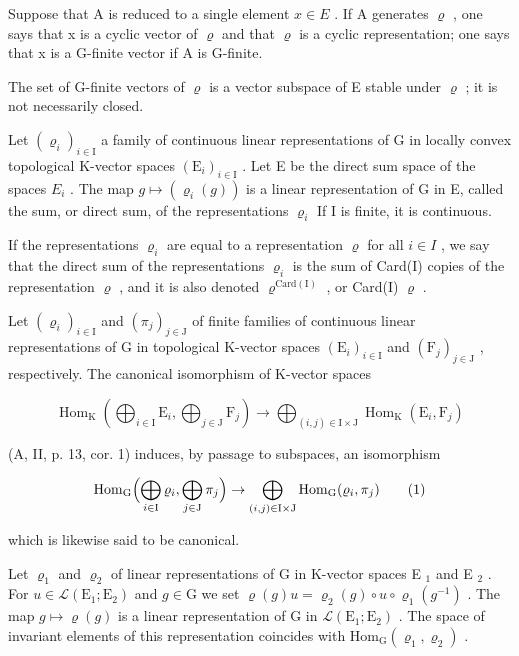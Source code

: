 Suppose that A is reduced to a single element \(x \in E\) . If A generates \(\varrho\) , one says that x is a cyclic vector of \(\varrho\) and that \(\varrho\) is a cyclic representation; one says that x is a G-finite vector if A is G-finite.

The set of G-finite vectors of \(\varrho\) is a vector subspace of E stable under \(\varrho\) ; it is not necessarily closed.

Let \((\varrho_{i})_{i\in\mathrm{I}}\) a family of continuous linear representations of G in locally convex topological K-vector spaces \((\mathrm{E}_{i})_{i\in\mathrm{I}}\) . Let E be the direct sum space of the spaces \(E_{i}\) . The map \(g\mapsto(\varrho_{i}(g))\) is a linear representation of G in E, called the sum, or direct sum, of the representations \(\varrho_{i}\) If I is finite, it is continuous.

If the representations \(\varrho_{i}\) are equal to a representation \(\varrho\) for all \(i \in I\) , we say that the direct sum of the representations \(\varrho_{i}\) is the sum of Card(I) copies of the representation \(\varrho\) , and it is also denoted \(\varrho^{\mathrm{Card(I)}}\) , or Card(I) \(\varrho\) .

Let \((\varrho_{i})_{i\in\mathrm{I}}\) and \((\pi_{j})_{j\in\mathrm{J}}\) of finite families of continuous linear representations of G in topological K-vector spaces \((\mathrm{E}_{i})_{i\in\mathrm{I}}\) and \((\mathrm{F}_{j})_{j\in\mathrm{J}}\) , respectively. The canonical isomorphism of K-vector spaces

\[
\operatorname{Hom} _ {\mathrm{K}} \left(\bigoplus_ {i \in \mathrm{I}} \mathrm{E} _ {i}, \bigoplus_ {j \in \mathrm{J}} \mathrm{F} _ {j}\right)\rightarrow \bigoplus_ {(i, j) \in \mathrm{I} \times \mathrm{J}} \operatorname{Hom} _ {\mathrm{K}} (\mathrm{E} _ {i}, \mathrm{F} _ {j})
\]

(A, II, p. 13, cor. 1) induces, by passage to subspaces, an isomorphism

\[
\mathrm{Hom} _ {\mathrm{G}} \Bigl (\bigoplus_ {i \in \mathrm{I}} \varrho_ {i}, \bigoplus_ {j \in \mathrm{J}} \pi_ {j} \Bigr) \to \bigoplus_ {(i, j) \in \mathrm{I} \times \mathrm{J}} \mathrm{Hom} _ {\mathrm{G}} (\varrho_ {i}, \pi_ {j})\tag{1}
\]

which is likewise said to be canonical.

Let \(\varrho_{1}\) and \(\varrho_{2}\) of linear representations of G in K-vector spaces E \(_{1}\) and E \(_{2}\) . For \(u \in \mathcal{L}(\mathrm{E}_{1};\mathrm{E}_{2})\) and \(g \in \mathrm{G}\) we set \(\varrho(g)u = \varrho_{2}(g) \circ u \circ \varrho_{1}(g^{-1})\) . The map \(g \mapsto \varrho(g)\) is a linear representation of G in \(\mathcal{L}(\mathrm{E}_{1};\mathrm{E}_{2})\) . The space of invariant elements of this representation coincides with \(\mathrm{Hom}_{\mathrm{G}}(\varrho_{1},\varrho_{2})\) .

